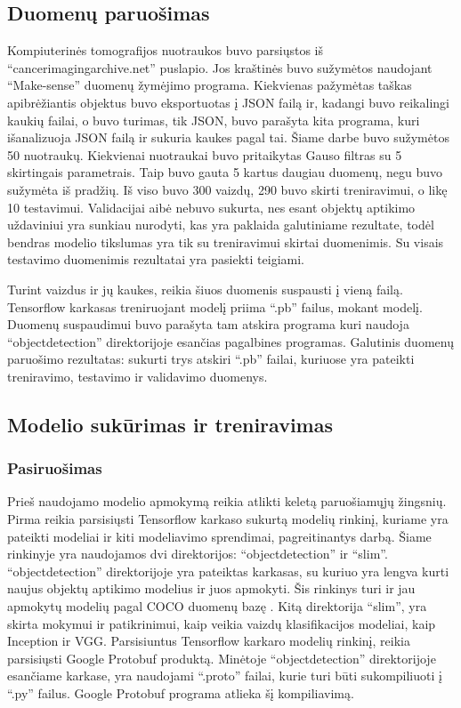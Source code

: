\documentclass{VUMIFInfKursinis}
\begin{document}
\subsection{Duomenų paruošimas}
\par
Kompiuterinės tomografijos nuotraukos buvo parsiųstos iš
\enquote{cancerimagingarchive.net} puslapio.
Jos kraštinės buvo sužymėtos naudojant \enquote{Make-sense} duomenų žymėjimo programa.
Kiekvienas pažymėtas taškas apibrėžiantis objektus buvo
eksportuotas į JSON failą ir, kadangi buvo reikalingi kaukių failai, o buvo turimas,
tik JSON, buvo parašyta kita programa, kuri išanalizuoja JSON failą ir
sukuria kaukes pagal tai. Šiame darbe buvo sužymėtos 50 nuotraukų.
Kiekvienai nuotraukai buvo pritaikytas Gauso filtras su 5 skirtingais
parametrais. Taip buvo gauta 5 kartus daugiau duomenų, negu buvo
sužymėta iš pradžių. Iš viso buvo 300 vaizdų, 290 buvo skirti treniravimui, o likę 10 testavimui. Validacijai aibė nebuvo sukurta, nes esant objektų aptikimo uždaviniui yra sunkiau nurodyti, kas yra paklaida galutiniame rezultate, todėl bendras modelio tikslumas yra tik su treniravimui skirtai duomenimis. Su visais testavimo duomenimis rezultatai yra pasiekti teigiami.
\par
Turint vaizdus ir jų kaukes, reikia šiuos duomenis suspausti į vieną failą.
Tensorflow karkasas treniruojant modelį priima \enquote{.pb} failus, mokant modelį.
Duomenų suspaudimui buvo parašyta tam atskira programa kuri naudoja \enquote{object\textunderscore detection}
direktorijoje esančias pagalbines programas.
Galutinis duomenų paruošimo rezultatas: sukurti trys atskiri \enquote{.pb}
failai, kuriuose yra pateikti treniravimo, testavimo ir validavimo duomenys.

\subsection{Modelio sukūrimas ir treniravimas}
\subsubsection{Pasiruošimas}
\par
Prieš naudojamo modelio apmokymą reikia atlikti keletą
paruošiamųjų žingsnių.
Pirma reikia parsisiųsti Tensorflow karkaso sukurtą modelių rinkinį, kuriame
yra pateikti modeliai ir kiti modeliavimo sprendimai, pagreitinantys darbą.
Šiame rinkinyje yra naudojamos dvi direktorijos: \enquote{object\textunderscore detection} ir \enquote{slim}.
\enquote{object\textunderscore detection} direktorijoje yra pateiktas karkasas, su kuriuo yra lengva
kurti naujus objektų aptikimo modelius ir juos apmokyti. Šis rinkinys turi ir
jau apmokytų modelių pagal COCO duomenų bazę \cite{salt21}. Kitą direktorija \enquote{slim},
yra skirta mokymui ir patikrinimui, kaip veikia vaizdų klasifikacijos
modeliai, kaip Inception ir VGG. Parsisiuntus Tensorflow karkaro modelių
rinkinį, reikia parsisiųsti Google Protobuf produktą. Minėtoje \enquote{object\textunderscore detection}
direktorijoje esančiame karkase, yra naudojami \enquote{.proto} failai, kurie turi būti
sukompiliuoti į \enquote{.py} failus. Google Protobuf programa atlieka šį kompiliavimą.
\end{document}
